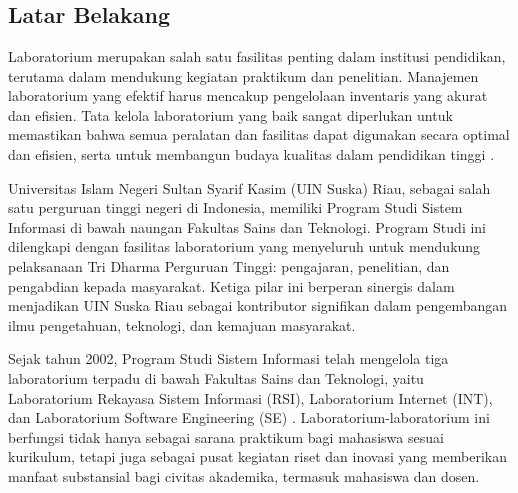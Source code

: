 %
%
%
%

\chapter{\babSatu}

\section{Latar Belakang}
Laboratorium merupakan salah satu fasilitas penting dalam institusi pendidikan, terutama dalam mendukung kegiatan praktikum dan penelitian. Manajemen laboratorium yang efektif harus mencakup pengelolaan inventaris yang akurat dan efisien. Tata kelola laboratorium yang baik sangat diperlukan untuk memastikan bahwa semua peralatan dan fasilitas dapat digunakan secara optimal dan efisien, serta untuk membangun budaya kualitas dalam pendidikan tinggi \cite{abrantes2020governance}.

Universitas Islam Negeri Sultan Syarif Kasim (UIN Suska) Riau, sebagai salah satu perguruan tinggi negeri di Indonesia, memiliki Program Studi Sistem Informasi di bawah naungan Fakultas Sains dan Teknologi. Program Studi ini dilengkapi dengan fasilitas laboratorium yang menyeluruh untuk mendukung pelaksanaan Tri Dharma Perguruan Tinggi: pengajaran, penelitian, dan pengabdian kepada masyarakat. Ketiga pilar ini berperan sinergis dalam menjadikan UIN Suska Riau sebagai kontributor signifikan dalam pengembangan ilmu pengetahuan, teknologi, dan kemajuan masyarakat.

Sejak tahun 2002, Program Studi Sistem Informasi telah mengelola tiga laboratorium terpadu di bawah Fakultas Sains dan Teknologi, yaitu Laboratorium Rekayasa Sistem Informasi (RSI), Laboratorium Internet (INT), dan Laboratorium Software Engineering (SE) \cite{lab-si-website}. Laboratorium-laboratorium ini berfungsi tidak hanya sebagai sarana praktikum bagi mahasiswa sesuai kurikulum, tetapi juga sebagai pusat kegiatan riset dan inovasi yang memberikan manfaat substansial bagi civitas akademika, termasuk mahasiswa dan dosen.

